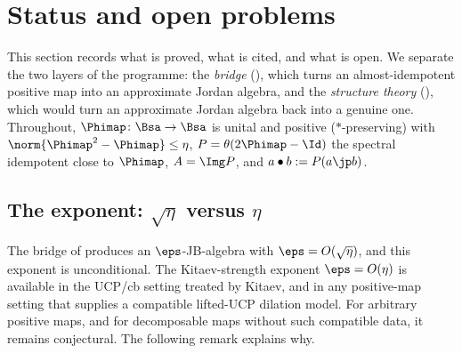\section{Status and open problems}\label{sec:discussion}

This section records what is proved, what is cited, and what is open. We
separate the two layers of the programme: the \emph{bridge}
(), which turns an almost-idempotent positive map into an
approximate Jordan algebra, and the \emph{structure theory}
(), which would turn an approximate Jordan algebra back into a
genuine one. Throughout, $\Phimap\colon\Bsa\to\Bsa$ is unital and positive
($\ast$-preserving) with $\norm{\Phimap^2-\Phimap}\le\eta$,
$P=\theta(2\Phimap-\Id)$ the spectral idempotent close to $\Phimap$,
$A=\Img P$, and $a\bullet b:=P(a\jp b)$.

\subsection{The exponent: \texorpdfstring{$\sqrt\eta$}{root eta} versus
\texorpdfstring{$\eta$}{eta}}

The bridge of  produces an $\eps$-JB-algebra with
$\eps=O(\sqrt\eta)$, and this exponent is unconditional. The Kitaev-strength
exponent $\eps=O(\eta)$ is available in the UCP/cb setting treated by
Kitaev, and in any positive-map setting that supplies a compatible lifted-UCP
dilation model. For arbitrary positive maps, and for decomposable maps without
such compatible data, it remains conjectural. The following remark explains why.

